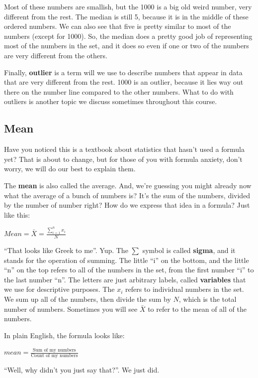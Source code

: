 \documentclass[
]{book}
\begin{document}
Most of these numbers are smallish, but the 1000 is a big old weird number, very different from the rest. The median is still 5, because it is in the middle of these ordered numbers. We can also see that five is pretty similar to most of the numbers (except for 1000). So, the median does a pretty good job of representing most of the numbers in the set, and it does so even if one or two of the numbers are very different from the others.

Finally, \textbf{outlier} is a term will we use to describe numbers that appear in data that are very different from the rest. 1000 is an outlier, because it lies way out there on the number line compared to the other numbers. What to do with outliers is another topic we discuss sometimes throughout this course.

\subsection{Mean}\label{mean}

Have you noticed this is a textbook about statistics that hasn't used a formula yet? That is about to change, but for those of you with formula anxiety, don't worry, we will do our best to explain them.

The \textbf{mean} is also called the average. And, we're guessing you might already now what the average of a bunch of numbers is? It's the sum of the numbers, divided by the number of number right? How do we express that idea in a formula? Just like this:

\(Mean = \bar{X} = \frac{\sum_{i=1}^{n} x_{i}}{N}\)

``That looks like Greek to me''. Yup. The \(\sum\) symbol is called \textbf{sigma}, and it stands for the operation of summing. The little ``i'' on the bottom, and the little ``n'' on the top refers to all of the numbers in the set, from the first number ``i'' to the last number ``n''. The letters are just arbitrary labels, called \textbf{variables} that we use for descriptive purposes. The \(x_{i}\) refers to individual numbers in the set. We sum up all of the numbers, then divide the sum by \(N\), which is the total number of numbers. Sometimes you will see \(\bar{X}\) to refer to the mean of all of the numbers.

In plain English, the formula looks like:

\(mean = \frac{\text{Sum of my numbers}}{\text{Count of my numbers}}\)

``Well, why didn't you just say that?''. We just did.
\end{document}
